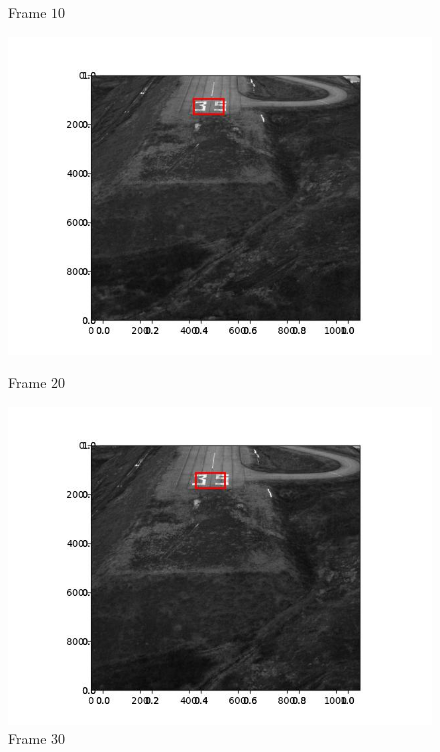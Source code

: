 \begin{figure}[H]
\begin{minipage}{.49\textwidth}
    \caption{Frame $10$}
  \end{minipage}
  \hfill
  \begin{minipage}{.49\textwidth}
    \centering
    \includegraphics[width=\textwidth]{./figures/lk/landing/frame000020.jpg}
    \caption{Frame $20$}
  \end{minipage}
  \begin{minipage}{.49\textwidth}
    \centering
    \includegraphics[width=\textwidth]{./figures/lk/landing/frame000030.jpg}
    \caption{Frame $30$}
  \end{minipage}
  \hfill
  \begin{minipage}{.49\textwidth}
    \centering

\end{minipage}
\end{figure}
